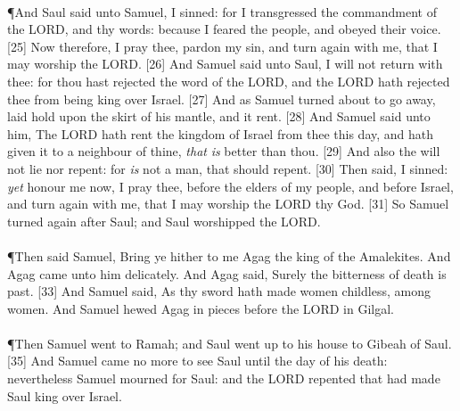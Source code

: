 \\
\P \textcolor[cmyk]{0.99998,1,0,0}{And Saul said unto Samuel, I   sinned: for I   transgressed the commandment of the LORD, and thy words: because I feared the people, and obeyed their voice.}
[25] \textcolor[cmyk]{0.99998,1,0,0}{Now therefore, I pray thee, pardon my sin, and turn again with me, that I may worship the LORD.}
[26] \textcolor[cmyk]{0.99998,1,0,0}{And Samuel said unto Saul, I will not return with thee: for thou hast rejected the word of the LORD, and the LORD hath rejected thee from being king over Israel.}
[27] \textcolor[cmyk]{0.99998,1,0,0}{And as Samuel turned about to go away,  laid hold upon the skirt of his mantle, and it rent.}
[28] \textcolor[cmyk]{0.99998,1,0,0}{And Samuel said unto him, The LORD hath rent the kingdom of Israel from thee this day, and hath given it to a neighbour of thine, \emph{that} \emph{is} better than thou.}
[29] \textcolor[cmyk]{0.99998,1,0,0}{And also the  will not lie nor repent: for  \emph{is} not a man, that  should repent.}
[30] \textcolor[cmyk]{0.99998,1,0,0}{Then  said, I   sinned: \emph{yet} honour me now, I pray thee, before the elders of my people, and before Israel, and turn again with me, that I may worship the LORD thy God.}
[31] \textcolor[cmyk]{0.99998,1,0,0}{So Samuel turned again after Saul; and Saul worshipped the LORD.}\\
\\
\P \textcolor[cmyk]{0.99998,1,0,0}{Then said Samuel, Bring ye hither to me Agag the king of the Amalekites. And Agag came unto him delicately. And Agag said, Surely the bitterness of death is past.}
[33] \textcolor[cmyk]{0.99998,1,0,0}{And Samuel said, As thy sword hath made women childless,  among women. And Samuel hewed Agag in pieces before the LORD in Gilgal.}\\
\\
\P \textcolor[cmyk]{0.99998,1,0,0}{Then Samuel went to Ramah; and Saul went up to his house to Gibeah of Saul.}
[35] \textcolor[cmyk]{0.99998,1,0,0}{And Samuel came no more to see Saul until the day of his death: nevertheless Samuel mourned for Saul: and the LORD repented that  had made Saul king over Israel.}